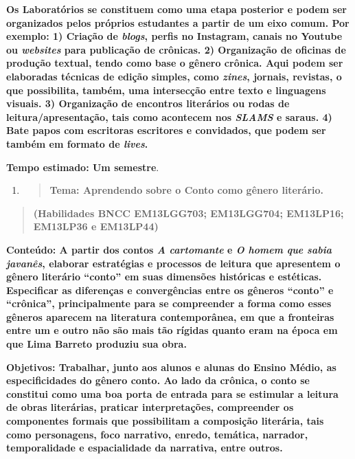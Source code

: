 \textbf{Os Laboratórios se constituem como uma etapa posterior e podem
ser organizados pelos próprios estudantes a partir de um eixo comum. Por
exemplo: 1) Criação de \emph{blogs}, perfis no Instagram, canais no
Youtube ou \emph{websites} para publicação de crônicas. 2) Organização
de oficinas de produção textual, tendo como base o gênero crônica. Aqui
podem ser elaboradas técnicas de edição simples, como \emph{zines},
jornais, revistas, o que possibilita, também, uma intersecção entre
texto e linguagens visuais. 3) Organização de encontros literários ou
rodas de leitura/apresentação, tais como acontecem nos \emph{SLAMS} e
saraus. 4) Bate papos com escritoras escritores e convidados, que podem
ser também em formato de \emph{lives}.}

\textbf{Tempo estimado: Um semestre}.

\begin{enumerate}
\def\labelenumi{\arabic{enumi})}
\setcounter{enumi}{3}
\item
  \begin{quote}
  \textbf{Tema: Aprendendo sobre o Conto como gênero literário.}
  \end{quote}
\end{enumerate}

\begin{quote}
\textbf{(Habilidades BNCC EM13LGG703; EM13LGG704; EM13LP16; EM13LP36 e
EM13LP44)}
\end{quote}

\textbf{Conteúdo: A partir dos contos \emph{A cartomante} e \emph{O
homem que sabia javanês}, elaborar estratégias e processos de leitura
que apresentem o gênero literário ``conto'' em suas dimensões históricas
e estéticas. Especificar as diferenças e convergências entre os gêneros
``conto'' e ``crônica'', principalmente para se compreender a forma como
esses gêneros aparecem na literatura contemporânea, em que a fronteiras
entre um e outro não são mais tão rígidas quanto eram na época em que
Lima Barreto produziu sua obra. }

\textbf{Objetivos: Trabalhar, junto aos alunos e alunas do Ensino Médio,
as especificidades do gênero conto. Ao lado da crônica, o conto se
constitui como uma boa porta de entrada para se estimular a leitura de
obras literárias, praticar interpretações, compreender os componentes
formais que possibilitam a composição literária, tais como personagens,
foco narrativo, enredo, temática, narrador, temporalidade e
espacialidade da narrativa, entre outros. }

